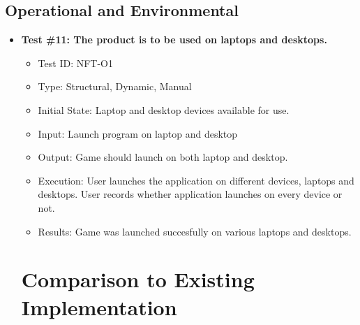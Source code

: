 \documentclass[12pt, titlepage]{article}
\begin{document}
\subsection{Operational and Environmental}
\begin{itemize}
\item \textbf{Test \#11: The product is to be used on laptops and desktops.}
\begin{itemize}
\item Test ID: NFT-O1
\item Type: Structural, Dynamic, Manual				
\item Initial State: Laptop and desktop devices available for use.		
\item Input: Launch program on laptop and desktop
\item Output: Game should launch on both laptop and desktop.		
\item Execution: User launches the application on different devices, laptops and desktops. User records whether application launches on every device or not.
\item Results: Game was launched succesfully on various laptops and desktops.
\end{itemize}


	
\section{Comparison to Existing Implementation}	


\end{itemize}
\end{document}
